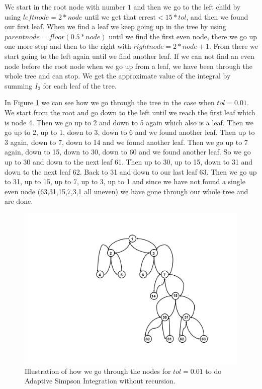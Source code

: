 \documentclass[a4paper,10pt]{article}
\begin{document}
We start in the root node with number $1$ and then we go to the left child by using $leftnode = 2*node$ until we get that $\text{errest}<15*tol$, and then we found our first leaf. When we find a leaf we keep going up in the tree by using $parentnode = floor(0.5 * node)$ until we find the first even node, there we go up one more step and then to the right with $rightnode = 2*node+1$. From there we start going to the left again until we find another leaf. If we can not find an even node before the root node when we go up from a leaf, we have been through the whole tree and can stop. We get the approximate value of the integral by summing $I_2$ for each leaf of the tree.

In Figure \ref{fig: tree} we can see how we go through the tree in the case when $tol=0.01$. We start from the root and go down to the left until we reach the first leaf which is node 4. Then we go up to 2 and down to 5 again which also is a leaf. Then we go up to 2, up to 1, down to 3, down to 6 and we found another leaf. Then up to 3 again, down to 7, down to 14 and we found another leaf. Then we go up to 7 again, down to 15, down to 30, down to 60 and we found another leaf. So we go up to 30 and down to the next leaf 61. Then up to 30, up to 15, down to 31 and down to the next leaf 62. Back to 31 and down to our last leaf 63. Then we go up to 31, up to 15, up to 7, up to 3, up to 1 and since we have not found a single even node (63,31,15,7,3,1 all uneven) we have gone through our whole tree and are done.

\begin{figure}[h!]
	\centering
	\includegraphics[width=\textwidth]{tree_graph}
	\caption{Illustration of how we go through the nodes for $tol=0.01$ to do Adaptive Simpson Integration without recursion.}
	\label{fig: tree}
\end{figure}
\end{document}
